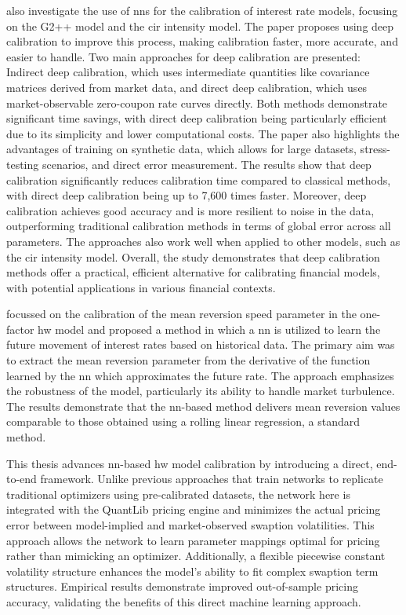 \textcite{alaya2021deep} also investigate the use of \ac{nn}s for the calibration of interest rate models, focusing on the G2++ model and the \ac{cir} intensity model. The paper proposes using deep calibration to improve this process, making calibration faster, more accurate, and easier to handle. Two main approaches for deep calibration are presented: Indirect deep calibration, which uses intermediate quantities like covariance matrices derived from market data, and direct deep calibration, which uses market-observable zero-coupon rate curves directly. Both methods demonstrate significant time savings, with direct deep calibration being particularly efficient due to its simplicity and lower computational costs. The paper also highlights the advantages of training on synthetic data, which allows for large datasets, stress-testing scenarios, and direct error measurement. The results show that deep calibration significantly reduces calibration time compared to classical methods, with direct deep calibration being up to 7,600 times faster. Moreover, deep calibration achieves good accuracy and is more resilient to noise in the data, outperforming traditional calibration methods in terms of global error across all parameters. The approaches also work well when applied to other models, such as the \ac{cir} intensity model. Overall, the study demonstrates that deep calibration methods offer a practical, efficient alternative for calibrating financial models, with potential applications in various financial contexts.

\textcite{moysiadis2019calibrating} focussed on the calibration of the mean reversion speed parameter in the one-factor \ac{hw} model and proposed a method in which a \ac{nn} is utilized to learn the future movement of interest rates based on historical data. The primary aim was to extract the mean reversion parameter from the derivative of the function learned by the \ac{nn} which approximates the future rate. The approach emphasizes the robustness of the model, particularly its ability to handle market turbulence. The results demonstrate that the \ac{nn}-based method delivers mean reversion values comparable to those obtained using a rolling linear regression, a standard method.

This thesis advances \ac{nn}-based \ac{hw} model calibration by introducing a direct, end-to-end framework. Unlike previous approaches that train networks to replicate traditional optimizers using pre-calibrated datasets, the network here is integrated with the QuantLib pricing engine and minimizes the actual pricing error between model-implied and market-observed swaption volatilities. This approach allows the network to learn parameter mappings optimal for pricing rather than mimicking an optimizer. Additionally, a flexible piecewise constant volatility structure enhances the model's ability to fit complex swaption term structures. Empirical results demonstrate improved out-of-sample pricing accuracy, validating the benefits of this direct machine learning approach.